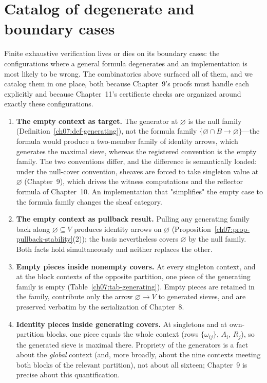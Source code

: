\section{Catalog of degenerate and boundary cases}\label{ch07:sec-degenerate}

Finite exhaustive verification lives or dies on its boundary cases: the configurations where a general formula degenerates and an implementation is most likely to be wrong. The combinatorics above surfaced all of them, and we catalog them in one place, both because Chapter~9's proofs must handle each explicitly and because Chapter~11's certificate checks are organized around exactly these configurations.

\begin{enumerate}
\item \textbf{The empty context as target.} The generator at $\varnothing$ is the null family (Definition~\ref{ch07:def-generating}), not the formula family $\{\varnothing\cap B\to\varnothing\}$---the formula would produce a two-member family of identity arrows, which generates the maximal sieve, whereas the registered convention is the empty family. The two conventions differ, and the difference is semantically loaded: under the null-cover convention, sheaves are forced to take singleton value at $\varnothing$ (Chapter~9), which drives the witness computations and the reflector formula of Chapter~10. An implementation that "simplifies" the empty case to the formula family changes the sheaf category.
\item \textbf{The empty context as pullback result.} Pulling any generating family back along $\varnothing\subseteq V$ produces identity arrows on $\varnothing$ (Proposition~\ref{ch07:prop-pullback-stability}(2)); the basis nevertheless covers $\varnothing$ by the null family. Both facts hold simultaneously and neither replaces the other.
\item \textbf{Empty pieces inside nonempty covers.} At every singleton context, and at the block contexts of the opposite partition, one piece of the generating family is empty (Table~\ref{ch07:tab-generating}). Empty pieces are retained in the family, contribute only the arrow $\varnothing\to V$ to generated sieves, and are preserved verbatim by the serialization of Chapter~8.
\item \textbf{Identity pieces inside generating covers.} At singletons and at own-partition blocks, one piece equals the whole context (rows $\{\omega_{ij}\}$, $A_{i}$, $R_{j}$), so the generated sieve is maximal there. Propriety of the generators is a fact about the \emph{global} context (and, more broadly, about the nine contexts meeting both blocks of the relevant partition), not about all sixteen; Chapter~9 is precise about this quantification.

\end{enumerate}
